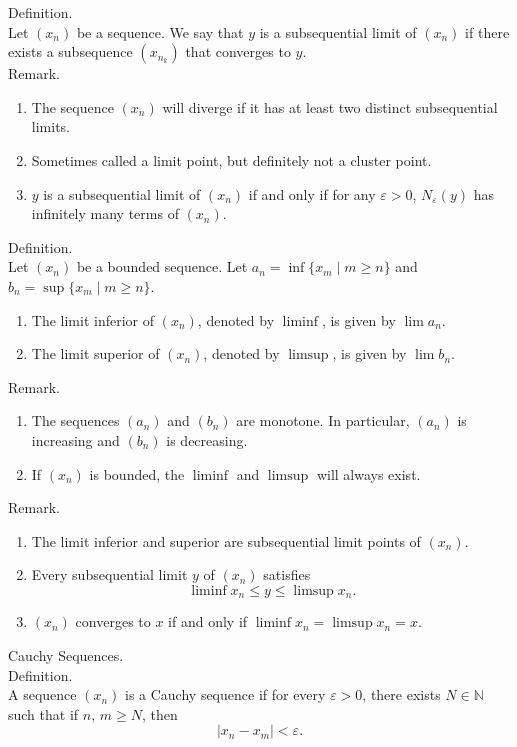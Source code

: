 \documentclass[twocolumn]{article}
\newcommand{\br}{\vspace{\baselineskip}}
\let\eps\varepsilon
\newcommand{\naturals}{\mathbb{N}}
\begin{document}
Definition. \\
Let $(x_n)$ be a sequence. We say that $y$ is a subsequential limit of $(x_n)$ if there exists a subsequence $(x_{n_k})$ that converges to $y$. \\

Remark.
\begin{enumerate}
	\item
	The sequence $(x_n)$ will diverge if it has at least two distinct subsequential limits.
	\item
	Sometimes called a limit point, but definitely not a cluster point.
	\item
	$y$ is a subsequential limit of $(x_n)$ if and only if for any $\eps > 0$, $N_\eps(y)$ has infinitely many terms of $(x_n)$.
\end{enumerate} \br

Definition. \\
Let $(x_n)$ be a bounded sequence. Let $a_n = \inf \{ x_m \mid m \geq n \}$ and $b_n = \sup \{ x_m \mid m \geq n \}$.
\begin{enumerate}
	\item
	The limit inferior of $(x_n)$, denoted by $\liminf$, is given by $\lim a_n$.
	\item
	The limit superior of $(x_n)$, denoted by $\limsup$, is given by $\lim b_n$.
\end{enumerate} \br

Remark.
\begin{enumerate}
	\item
	The sequences $(a_n)$ and $(b_n)$ are monotone. In particular, $(a_n)$ is increasing and $(b_n)$ is decreasing.
	\item
	If $(x_n)$ is bounded, the $\liminf$ and $\limsup$ will always exist.
\end{enumerate} \br

Remark.
\begin{enumerate}
	\item
	The limit inferior and superior are subsequential limit points of $(x_n)$.
	\item
	Every subsequential limit $y$ of $(x_n)$ satisfies
	$$\liminf x_n \leq y \leq \limsup x_n \text{.}$$
	\item
	$(x_n)$ converges to $x$ if and only if $\liminf x_n = \limsup x_n = x$.
\end{enumerate} \br

Cauchy Sequences. \\

Definition. \\
A sequence $(x_n)$ is a Cauchy sequence if for every $\eps > 0$, there exists $N \in \naturals$ such that if $n,\, m \geq N$, then
$$|x_n - x_m| < \eps\text{.}$$ \\
\end{document}
